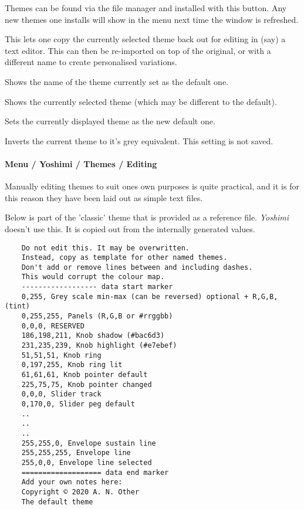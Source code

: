     {}Themes can be found via the file manager and
   installed with this button. Any new themes one installs will show in the menu
   next time the window is refreshed.

    {}This lets one copy the currently selected theme back
   out for editing in (say) a text editor. This can then be re-imported on top of
   the original, or with a different name to create personalised variations.

    {}Shows the name of the theme currently set as
   the default one.

     {}Shows the currently selected theme (which
    may be different to the default).

    {}Sets the currently displayed theme as the new default
   one.

    {}Inverts the current theme to it's grey equivalent. This
   setting is not saved.

\paragraph{Menu / Yoshimi / Themes / Editing}
\label{paragraph:menu_yoshimi_themes_editing}
   Manually editing themes to suit ones own purposes is quite practical, and it
   is for this reason they have been laid out as simple text files.

   Below is part of the 'classic' theme that is provided as a reference file.
   \textsl{Yoshimi} doesn't use this. It is copied out from the internally
   generated values.

   \begin{verbatim}
    Do not edit this. It may be overwritten.
    Instead, copy as template for other named themes.
    Don't add or remove lines between and including dashes.
    This would corrupt the colour map.
    ------------------ data start marker
    0,255, Grey scale min-max (can be reversed) optional + R,G,B, (tint)
    0,255,255, Panels (R,G,B or #rrggbb)
    0,0,0, RESERVED
    186,198,211, Knob shadow (#bac6d3)
    231,235,239, Knob highlight (#e7ebef)
    51,51,51, Knob ring
    0,197,255, Knob ring lit
    61,61,61, Knob pointer default
    225,75,75, Knob pointer changed
    0,0,0, Slider track
    0,170,0, Slider peg default
    ..
    ..
    ..
    255,255,0, Envelope sustain line
    255,255,255, Envelope line
    255,0,0, Envelope line selected
    =================== data end marker
    Add your own notes here:
    Copyright © 2020 A. N. Other
    The default theme
   \end{verbatim}

